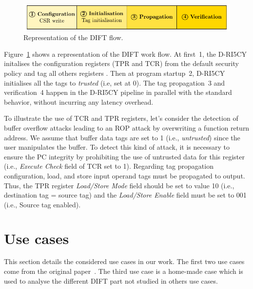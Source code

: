 \begin{figure}[t]
    \centering
    \includegraphics[width=\textwidth]{c3_vulnerabilities_assessment/img/dift_workflow.pdf}
    \caption{Representation of the DIFT flow.}
    \label{fig:dift_workflow}
\end{figure}

Figure~\ref{fig:dift_workflow} shows a representation of the DIFT work flow. At first~\textcircled{\small{1}}, the D-RI5CY initalises the configuration registers (TPR and TCR) from the default security policy and tag all others registers .
Then at program startup~\textcircled{\small{2}}, D-RI5CY initialises all the tags to \textit{trusted} (i.e, set at 0).
The tag propagation~\textcircled{\small{3}} and verification~\textcircled{\small{4}} happen in the D-RI5CY pipeline in parallel with the standard behavior, without incurring any latency overhead.

To illustrate the use of TCR and TPR registers, let's consider the detection of buffer overflow attacks leading to an ROP attack by overwriting a function return address. We assume that buffer data tags are set to 1 (i.e., \textit{untrusted}) since the user manipulates the buffer.
To detect this kind of attack, it is necessary to ensure the PC integrity by prohibiting the use of untrusted data for this register (i.e., \textit{Execute Check} field of TCR set to 1). Regarding tag propagation configuration, load, and store input operand tags must be propagated to output. Thus, the TPR register \textit{Load/Store Mode} field should be set to value 10 (i.e., destination tag = source tag) and the \textit{Load/Store Enable} field must be set to 001 (i.e., Source tag enabled).

\section{Use cases}
\label{section:uses_cases}

This section details the considered use cases in our work. The first two use cases come from the original paper~\cite{PDGLC-18-hpec}. The third use case is a home-made case which is used to analyse the different DIFT part not studied in others use cases.

